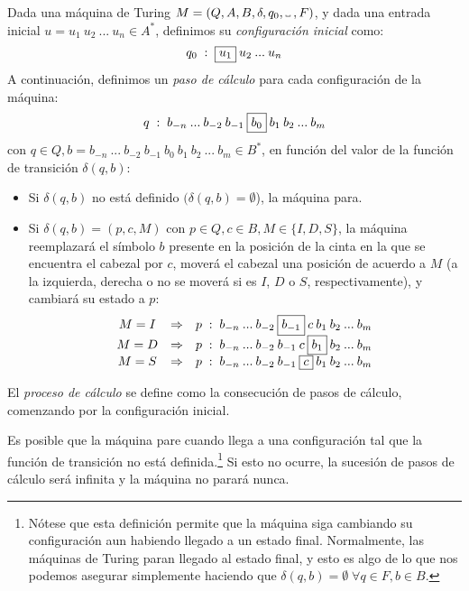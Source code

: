 \begin{definicion}\label{def:proceso-calculo-maquina-turing}
Dada una máquina de Turing $M=(Q, A, B, \delta, q_0, \Vtextvisiblespace\:, F)$, y dada una entrada inicial $u = u_1\:u_2\:...\:u_n\in A^*$, definimos su \emph{configuración inicial} como:
$$
    q_0\;:\;\fbox{$u_1$}\:u_2\:...\:u_n
$$
A continuación, definimos un \emph{paso de cálculo}  para cada configuración de la máquina:
$$q\;:\;b_{-n}\:...\:b_{-2}\:b_{-1}\:\fbox{$b_0$}\:b_1\:b_2\:...\:b_m$$
con $q\in Q, b=b_{-n}\:...\:b_{-2}\:b_{-1}\:b_0\:b_1\:b_2\:...\:b_m\in B^*$, en función del valor de la función de transición $\delta(q,b)$:
\begin{itemize}
    \item Si $\delta(q,b)$ no está definido $(\delta(q,b)=\emptyset$), la máquina para.
    \item Si $\delta(q,b)=(p,c,M)$ con $p\in Q, c\in B, M\in \{I,D,S\}$, la máquina reemplazará el símbolo $b$ presente en la posición de la cinta en la que se encuentra el cabezal por $c$, moverá el cabezal una posición de acuerdo a $M$ (a la izquierda, derecha o no se moverá si es $I$, $D$ o $S$, respectivamente), y cambiará su estado a $p$:
    $$
        \begin{matrix}
            M=I&\Rightarrow&p\;:\;b_{-n}\:...\:b_{-2}\:\fbox{$b_{-1}$}\:c\:b_1\:b_2\:...\:b_m\\
            M=D&\Rightarrow&p\;:\;b_{-n}\:...\:b_{-2}\:b_{-1}\:c\:\fbox{$b_1$}\:b_2\:...\:b_m\\
            M=S&\Rightarrow&p\;:\;b_{-n}\:...\:b_{-2}\:b_{-1}\:\fbox{$c$}\:b_1\:b_2\:...\:b_m
        \end{matrix}
    $$
\end{itemize}
El \emph{proceso de cálculo} se define como la consecución de pasos de cálculo, comenzando por la configuración inicial.

Es posible que la máquina pare cuando llega a una configuración tal que la función de transición no está definida.\footnote{Nótese que esta definición permite que la máquina siga cambiando su configuración aun habiendo llegado a un estado final. Normalmente, las máquinas de Turing paran llegado al estado final, y esto es algo de lo que nos podemos asegurar simplemente haciendo que $\delta(q,b)=\emptyset\;\forall q\in F, b\in B$.} Si esto no ocurre, la sucesión de pasos de cálculo será infinita y la máquina no parará nunca.
\end{definicion}

